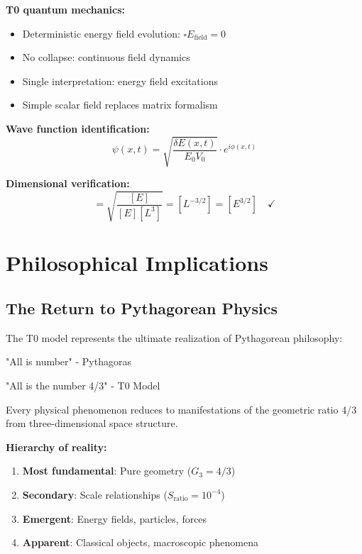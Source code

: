 \documentclass[12pt,a4paper]{report}
\begin{document}
\textbf{T0 quantum mechanics:}
\begin{itemize}
	\item Deterministic energy field evolution: $\square E_{\text{field}} = 0$
	\item No collapse: continuous field dynamics
	\item Single interpretation: energy field excitations
	\item Simple scalar field replaces matrix formalism
\end{itemize}

\textbf{Wave function identification:}
\begin{equation}
	\psi(x,t) = \sqrt{\frac{\delta E(x,t)}{E_0 V_0}} \cdot e^{i\phi(x,t)}
\end{equation}

\textbf{Dimensional verification:}
\begin{equation}
	[\psi] = \sqrt{\frac{[E]}{[E][L^3]}} = [L^{-3/2}] = [E^{3/2}] \quad \checkmark
\end{equation}

\section{Philosophical Implications}
\label{sec:philosophical_implications}

\subsection{The Return to Pythagorean Physics}
\label{subsec:pythagorean_physics}

The T0 model represents the ultimate realization of Pythagorean philosophy:

\begin{tcolorbox}[colback=blue!5!white,colframe=blue!75!black,title=Pythagorean Insight Realized]
	"All is number" - Pythagoras
	
	"All is the number 4/3" - T0 Model
	
	Every physical phenomenon reduces to manifestations of the geometric ratio 4/3 from three-dimensional space structure.
\end{tcolorbox}

\textbf{Hierarchy of reality:}
\begin{enumerate}
	\item \textbf{Most fundamental}: Pure geometry ($G_3 = 4/3$)
	\item \textbf{Secondary}: Scale relationships ($S_{\text{ratio}} = 10^{-4}$)
	\item \textbf{Emergent}: Energy fields, particles, forces
	\item \textbf{Apparent}: Classical objects, macroscopic phenomena
\end{enumerate}
\end{document}
